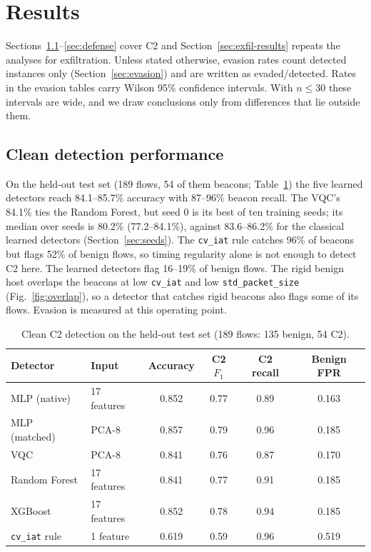 \documentclass[preprint,12pt]{elsarticle}
\begin{document}
\section{Results}
\label{sec:results}

Sections~\ref{sec:clean}--\ref{sec:defense} cover C2 and Section~\ref{sec:exfil-results} repeats the
analyses for exfiltration. Unless stated otherwise, evasion rates count detected instances only
(Section~\ref{sec:evasion}) and are written as evaded/detected. Rates in the evasion tables carry
Wilson 95\% confidence intervals. With $n\le 30$ these intervals are wide, and we draw conclusions only
from differences that lie outside them.

\subsection{Clean detection performance}
\label{sec:clean}
On the held-out test set (189 flows, 54 of them beacons; Table~\ref{tab:clean}) the five learned
detectors reach 84.1--85.7\% accuracy with 87--96\% beacon recall. The VQC's 84.1\% ties the Random
Forest, but seed 0 is its best of ten training seeds; its median over seeds is 80.2\% (77.2--84.1\%),
against 83.6--86.2\% for the classical learned detectors (Section~\ref{sec:seeds}). The
\texttt{cv\_iat} rule catches 96\% of beacons but flags 52\% of benign flows, so timing regularity alone
is not enough to detect C2 here. The learned detectors flag 16--19\% of benign flows. The rigid benign
host overlaps the beacons at low \texttt{cv\_iat} and low \texttt{std\_packet\_size}
(Fig.~\ref{fig:overlap}), so a detector that catches rigid beacons also flags some of its flows.
Evasion is measured at this operating point.

\begin{table}[h]
\centering
\caption{Clean C2 detection on the held-out test set (189 flows: 135 benign, 54 C2).}
\label{tab:clean}
\setlength{\tabcolsep}{4pt}\small
\begin{tabular}{llcccc}
\toprule
Detector & Input & Accuracy & C2 $F_1$ & C2 recall & Benign FPR \\
\midrule
MLP (native)        & 17 features & 0.852 & 0.77 & 0.89 & 0.163 \\
MLP (matched)       & PCA-8       & 0.857 & 0.79 & 0.96 & 0.185 \\
VQC                 & PCA-8       & 0.841 & 0.76 & 0.87 & 0.170 \\
Random Forest       & 17 features & 0.841 & 0.77 & 0.91 & 0.185 \\
XGBoost             & 17 features & 0.852 & 0.78 & 0.94 & 0.185 \\
\texttt{cv\_iat} rule & 1 feature  & 0.619 & 0.59 & 0.96 & 0.519 \\
\bottomrule
\end{tabular}
\end{table}
\end{document}
